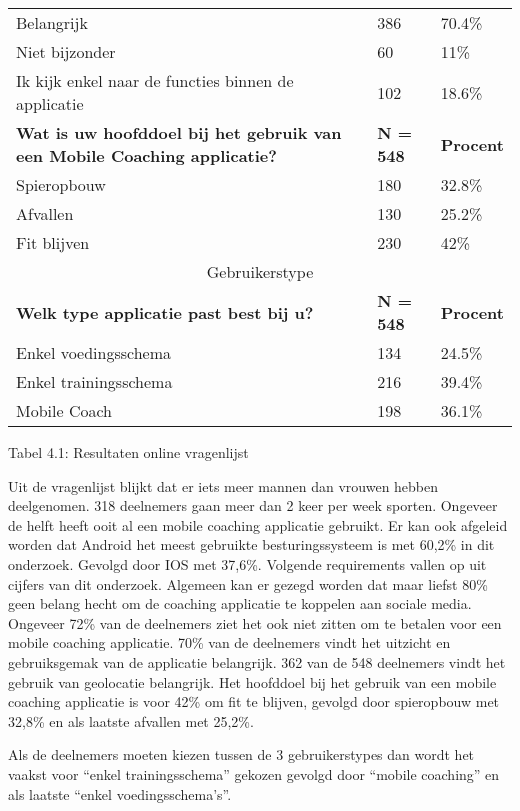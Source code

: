 \begin{center}
\begin{tabular}{ |p{10cm}|p{2cm}|p{2cm}| }
 \hline
Belangrijk   & 386    &70.4\%   \\
Niet bijzonder & 60   &11\%   \\
Ik kijk enkel naar de functies binnen de applicatie &   102  &18.6\%   \\
 \hline
          \textbf{Wat is uw hoofddoel bij het gebruik van een Mobile Coaching applicatie?} & \textbf{N = 548} &\textbf{Procent}\\ 
 \hline
Spieropbouw  & 180    &32.8\%   \\
Afvallen & 130   &25.2\%   \\
Fit blijven &   230  &42\%   \\
  \hline
 \multicolumn{3}{|c|}{Gebruikerstype} \\
 \hline
         \textbf{Welk type applicatie past best bij u?} & \textbf{N = 548} &\textbf{Procent}\\ 
 \hline
 Enkel voedingsschema & 134    &24.5\%   \\
Enkel trainingsschema & 216  &39.4\%   \\
Mobile Coach &   198  &36.1\%   \\
  \hline
\end{tabular}
  \caption{Tabel 4.1: Resultaten online vragenlijst}
\end{center}
\newpage
Uit de vragenlijst blijkt dat er iets meer mannen dan vrouwen hebben deelgenomen. 318 deelnemers gaan meer dan 2 keer per week sporten. Ongeveer de helft heeft ooit al een mobile coaching applicatie gebruikt. Er kan ook afgeleid worden dat Android het meest gebruikte besturingssysteem is met 60,2\% in dit onderzoek. Gevolgd door IOS met 37,6\%. 
Volgende requirements vallen op uit cijfers van dit onderzoek. Algemeen kan er gezegd worden dat maar liefst 80\% geen belang hecht om de coaching applicatie te koppelen aan sociale media. Ongeveer 72\% van de deelnemers ziet het ook niet zitten om te betalen voor een mobile coaching applicatie. 70\% van de deelnemers vindt het uitzicht en gebruiksgemak van de applicatie belangrijk. 362 van de 548 deelnemers vindt het gebruik van geolocatie belangrijk. Het hoofddoel bij het gebruik van een mobile coaching applicatie is voor 42\% om fit te blijven, gevolgd door spieropbouw met 32,8\% en als laatste afvallen met 25,2\%.

Als de deelnemers moeten kiezen tussen de 3 gebruikerstypes dan wordt het vaakst voor “enkel trainingsschema” gekozen gevolgd door “mobile coaching” en als laatste  “enkel voedingsschema’s”. 


